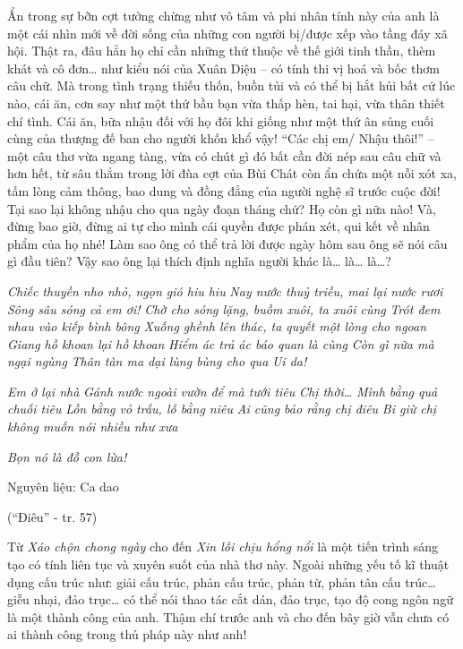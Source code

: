 \documentclass[../main.tex]{subfiles}
\begin{document}
\begin{multicols}{2}
Ẩn trong sự bỡn cợt tưởng chừng như vô tâm và phi nhân tính này của anh là một cái nhìn mới về đời sống của những con người bị/được xếp vào tầng đáy xã hội. Thật ra, đâu hẳn họ chỉ cần những thứ thuộc về thế giới tinh thần, thèm khát và cô đơn… như kiểu nói của Xuân Diệu – có tính thi vị hoá và bốc thơm câu chữ. Mà trong tình trạng thiếu thốn, buồn tủi và có thể bị hắt hủi bất cứ lúc nào, cái ăn, cơn say như một thứ bầu bạn vừa thấp hèn, tai hại, vừa thân thiết chí tình. Cái ăn, bữa nhậu đối với họ đôi khi giống như một thứ ân sủng cuối cùng của thượng đế ban cho người khốn khổ vậy! “Các chị em/ Nhậu thôi!” – một câu thơ vừa ngang tàng, vừa có chút gì đó bất cần đời nép sau câu chữ và hơn hết, từ sâu thẳm trong lời đùa cợt của Bùi Chát còn ẩn chứa một nỗi xót xa, tấm lòng cảm thông, bao dung và đồng đẳng của người nghệ sĩ trước cuộc đời! Tại sao lại không nhậu cho qua ngày đoạn tháng chứ? Họ còn gì nữa nào! Và, đừng bao giờ, đừng ai tự cho mình cái quyền được phán xét, qui kết về nhân phẩm của họ nhé! Làm sao ông có thể trả lời được ngày hôm sau ông sẽ nói câu gì đầu tiên? Vậy sao ông lại thích định nghĩa người khác là… là… là…? 
\begin{blockquote}


\textit{Chiếc thuyền nho nhỏ, ngọn gió hiu hiu} 
\textit{Nay nước thuỷ triều, mai lại nước rươi} 
\textit{Sông sâu sóng cả em ơi!} 
\textit{Chờ cho sóng lặng, buồm xuôi, ta xuôi cùng} 
\textit{Trót đem nhau vào kiếp bình bông} 
\textit{Xuống ghềnh lên thác, ta quyết một lòng cho ngoan} 
\textit{Giang hồ khoan lại hồ khoan} 
\textit{Hiểm ác trả ác báo quan là cùng} 
\textit{Còn gì nữa mà ngại ngùng} 
\textit{Thân tàn ma dại lùng bùng cho qua} 
\textit{Ui da!} 

\textit{Em ở lại nhà} 
\textit{Gánh nước ngoài vườn để mà tưới tiêu} 
\textit{Chị thời…} 
\textit{Mình bằng quả chuối tiêu} 
\textit{Lồn bằng vỏ trấu, lỗ bằng niêu} 
\textit{Ai cũng bảo rằng chị điêu} 
\textit{Bi giừ chị không muốn nói nhiều như xưa} 

\textit{Bọn nó là đồ con lừa!} 

Nguyên liệu: Ca dao 

(“Điêu” - tr. 57) 

\end{blockquote}


Từ \textit{Xáo chộn chong ngày }cho đến \textit{Xin lỗi chịu hổng nổi} là một tiến trình sáng tạo có tính liên tục và xuyên suốt của nhà thơ này. Ngoài những yếu tố kĩ thuật dụng cấu trúc như: giải cấu trúc, phản cấu trúc, phản từ, phản tân cấu trúc… giễu nhại, đảo trục… có thể nói thao tác cắt dán, đảo trục, tạo độ cong ngôn ngữ là một thành công của anh. Thậm chí trước anh và cho đến bây giờ vẫn chưa có ai thành công trong thủ pháp này như anh! 
\begin{blockquote}



\end{blockquote}
\end{multicols}
\end{document}
